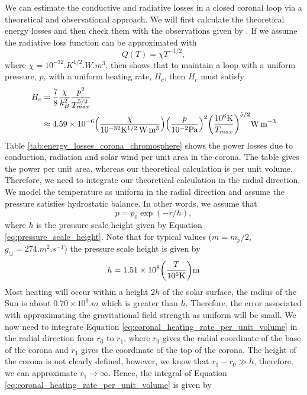 We can estimate the conductive and radiative losses in a closed coronal loop via a theoretical and observational approach. We will first calculate the theoretical energy losses and then check them with the observations given by \citet{Withbroe1977}. If we assume the radiative loss function can be approximated with
\begin{equation}
    Q(T) = \chi T^{-1/2},
\end{equation}
where $\chi=10^{-32}\si{.K^{1/2}.W.m^3}$, then \citet{Priest2014} shows that to maintain a loop with a uniform pressure, $p$, with a uniform heating rate, $H_c$, then $H_c$ must satisfy
\begin{equation}
    \label{eq:coronal_heating_rate_per_unit_volume}
    \begin{aligned}
    H_c &= \frac{7}{8}\frac{\chi}{k_B^2}\frac{p^2}{T_{max}^{5/2}} \\
    &\approx 4.59\times10^{-6}\qty(\frac{\chi}{10^{-32}\si{.K^{1/2}.W.m^3}})\qty(\frac{p}{10^{-2}\si{.Pa}})^2\qty(\frac{10^6\si{.K}}{T_{max}})^{5/2}\si{.W.m^{-3}}
    \end{aligned}
\end{equation}
Table \ref{tab:energy_losses_corona_chromosphere} shows the power losses due to conduction, radiation and solar wind per unit area in the corona. The table gives the power per unit area, whereas our theoretical calculation is per unit volume. Therefore, we need to integrate our theoretical calculation in the radial direction. We model the temperature as uniform in the radial direction and assume the pressure satisfies hydrostatic balance. In other words, we assume that
\begin{equation}
    p=p_0\exp(-r/h),
\end{equation}
where $h$ is the pressure scale height given by Equation \eqref{eq:pressure_scale_height}. Note that for typical values ($m=m_p/2$, $g_{\odot}=274\si{.m^2.s^{-1}}$) the pressure scale height is given by
\begin{equation}
    h = 1.51\times10^8\qty(\frac{T}{10^6\si{.K}})\si{.m}
\end{equation}
Most heating will occur within a height $2h$ of the solar surface, the radius of the Sun is about $0.70\times10^9\si{.m}$ \citep{sun_vital_statistics} which is greater than $h$. Therefore, the error associated with approximating the gravitational field strength as uniform will be small. 
We now need to integrate Equation \eqref{eq:coronal_heating_rate_per_unit_volume} in the radial direction from $r_0$ to $r_1$, where $r_0$ gives the radial coordinate of the base of the corona and $r_1$ gives the coordinate of the top of the corona. The height of the corona is not clearly defined, however, we know that $r_1-r_0\gg h$, therefore, we can approximate $r_1\rightarrow \infty$. Hence, the integral of Equation \eqref{eq:coronal_heating_rate_per_unit_volume} is given by
